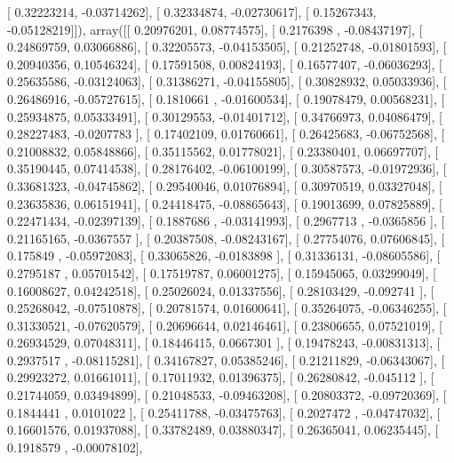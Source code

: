 \documentclass{article}
\begin{document}
       [ 0.32223214, -0.03714262],
       [ 0.32334874, -0.02730617],
       [ 0.15267343, -0.05128219]]), array([[ 0.20976201,  0.08774575],
       [ 0.2176398 , -0.08437197],
       [ 0.24869759,  0.03066886],
       [ 0.32205573, -0.04153505],
       [ 0.21252748, -0.01801593],
       [ 0.20940356,  0.10546324],
       [ 0.17591508,  0.00824193],
       [ 0.16577407, -0.06036293],
       [ 0.25635586, -0.03124063],
       [ 0.31386271, -0.04155805],
       [ 0.30828932,  0.05033936],
       [ 0.26486916, -0.05727615],
       [ 0.1810661 , -0.01600534],
       [ 0.19078479,  0.00568231],
       [ 0.25934875,  0.05333491],
       [ 0.30129553, -0.01401712],
       [ 0.34766973,  0.04086479],
       [ 0.28227483, -0.0207783 ],
       [ 0.17402109,  0.01760661],
       [ 0.26425683, -0.06752568],
       [ 0.21008832,  0.05848866],
       [ 0.35115562,  0.01778021],
       [ 0.23380401,  0.06697707],
       [ 0.35190445,  0.07414538],
       [ 0.28176402, -0.06100199],
       [ 0.30587573, -0.01972936],
       [ 0.33681323, -0.04745862],
       [ 0.29540046,  0.01076894],
       [ 0.30970519,  0.03327048],
       [ 0.23635836,  0.06151941],
       [ 0.24418475, -0.08865643],
       [ 0.19013699,  0.07825889],
       [ 0.22471434, -0.02397139],
       [ 0.1887686 , -0.03141993],
       [ 0.2967713 , -0.0365856 ],
       [ 0.21165165, -0.0367557 ],
       [ 0.20387508, -0.08243167],
       [ 0.27754076,  0.07606845],
       [ 0.175849  , -0.05972083],
       [ 0.33065826, -0.0183898 ],
       [ 0.31336131, -0.08605586],
       [ 0.2795187 ,  0.05701542],
       [ 0.17519787,  0.06001275],
       [ 0.15945065,  0.03299049],
       [ 0.16008627,  0.04242518],
       [ 0.25026024,  0.01337556],
       [ 0.28103429, -0.092741  ],
       [ 0.25268042, -0.07510878],
       [ 0.20781574,  0.01600641],
       [ 0.35264075, -0.06346255],
       [ 0.31330521, -0.07620579],
       [ 0.20696644,  0.02146461],
       [ 0.23806655,  0.07521019],
       [ 0.26934529,  0.07048311],
       [ 0.18446415,  0.0667301 ],
       [ 0.19478243, -0.00831313],
       [ 0.2937517 , -0.08115281],
       [ 0.34167827,  0.05385246],
       [ 0.21211829, -0.06343067],
       [ 0.29923272,  0.01661011],
       [ 0.17011932,  0.01396375],
       [ 0.26280842, -0.045112  ],
       [ 0.21744059,  0.03494899],
       [ 0.21048533, -0.09463208],
       [ 0.20803372, -0.09720369],
       [ 0.1844441 ,  0.0101022 ],
       [ 0.25411788, -0.03475763],
       [ 0.2027472 , -0.04747032],
       [ 0.16601576,  0.01937088],
       [ 0.33782489,  0.03880347],
       [ 0.26365041,  0.06235445],
       [ 0.1918579 , -0.00078102],
\end{document}
